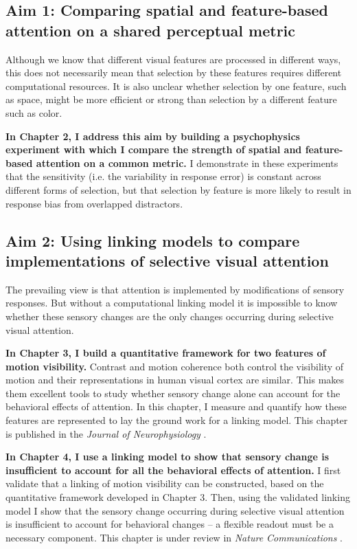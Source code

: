 \subsection{Aim 1: Comparing spatial and feature-based attention on a shared perceptual metric}

Although we know that different visual features are processed in different ways, this does not necessarily mean that selection by these features requires different computational resources. It is also unclear whether selection by one feature, such as space, might be more efficient or strong than selection by a different feature such as color.

\textbf{In Chapter 2, I address this aim by building a psychophysics experiment with which I compare the strength of spatial and feature-based attention on a common metric.} I demonstrate in these experiments that the sensitivity (i.e. the variability in response error) is constant across different forms of selection, but that selection by feature is more likely to result in response bias from overlapped distractors. 

\subsection{Aim 2: Using linking models to compare implementations of selective visual attention}

The prevailing view is that attention is implemented by modifications of sensory responses. But without a computational linking model it is impossible to know whether these sensory changes are the only changes occurring during selective visual attention. 

\textbf{In Chapter 3, I build a quantitative framework for two features of motion visibility.} Contrast and motion coherence both control the visibility of motion and their representations in human visual cortex are similar. This makes them excellent tools to study whether sensory change alone can account for the behavioral effects of attention. In this chapter, I measure and quantify how these features are represented to lay the ground work for a linking model. This chapter is published in the \textit{Journal of Neurophysiology} \citep{Birman2018-sp}.

\textbf{In Chapter 4, I use a linking model to show that sensory change is insufficient to account for all the behavioral effects of attention.} I first validate that a linking of motion visibility can be constructed, based on the quantitative framework developed in Chapter 3. Then, using the validated linking model I show that the sensory change occurring during selective visual attention is insufficient to account for behavioral changes -- a flexible readout must be a necessary component. This chapter is under review in \textit{Nature Communications} \citep{Birman_undated-vk}.
